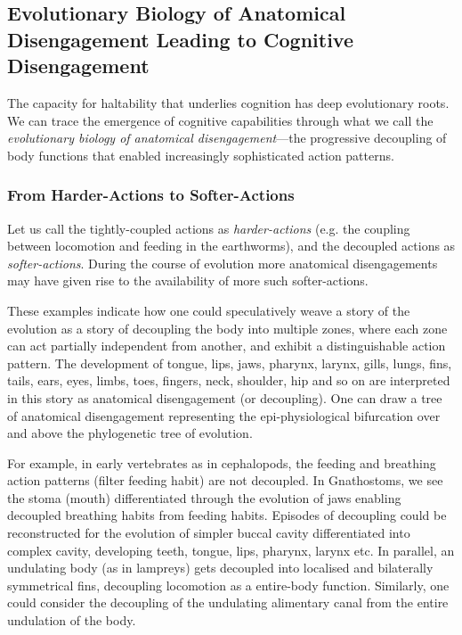 
\subsection{Evolutionary Biology of Anatomical Disengagement Leading to Cognitive Disengagement}
\label{subsec:evolutionary_disengagement}

The capacity for haltability that underlies cognition has deep evolutionary roots. We can trace the emergence of cognitive capabilities through what we call the \textit{evolutionary biology of anatomical disengagement}—the progressive decoupling of body functions that enabled increasingly sophisticated action patterns.

\subsubsection{From Harder-Actions to Softer-Actions}
Let us call the tightly-coupled actions as \textit{harder-actions} (e.g. the coupling between locomotion and feeding in the earthworms), and the decoupled actions as \textit{softer-actions}. During the course of evolution more anatomical disengagements may have given rise to the availability of more such softer-actions.

These examples indicate how one could speculatively weave a story of the evolution as a story of decoupling the body into multiple zones, where each zone can act partially independent from another, and exhibit a distinguishable action pattern. The development of tongue, lips, jaws, pharynx, larynx, gills, lungs, fins, tails, ears, eyes, limbs, toes, fingers, neck, shoulder, hip and so on are interpreted in this story as anatomical disengagement (or decoupling). One can draw a tree of anatomical disengagement representing the epi-physiological bifurcation over and above the phylogenetic tree of evolution.

For example, in early vertebrates as in cephalopods, the feeding and breathing action patterns (filter feeding habit) are not decoupled. In Gnathostoms, we see the stoma (mouth) differentiated through the evolution of jaws enabling decoupled breathing habits from feeding habits. Episodes of decoupling could be reconstructed for the evolution of simpler buccal cavity differentiated into complex cavity, developing teeth, tongue, lips, pharynx, larynx etc. In parallel, an undulating body (as in lampreys) gets decoupled into localised and bilaterally symmetrical fins, decoupling locomotion as a entire-body function. Similarly, one could consider the decoupling of the undulating alimentary canal from the entire undulation of the body.

